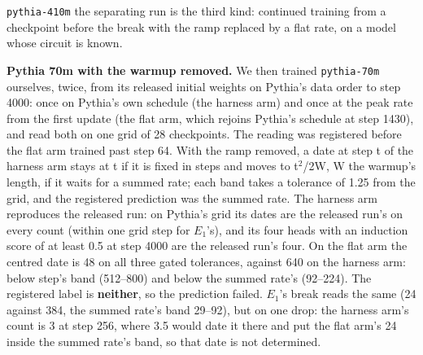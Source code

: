 \documentclass[11pt]{article}
\begin{document}
\texttt{pythia-410m} the separating run is the third kind: continued training from a checkpoint before the break with the ramp replaced by a flat rate, on a model whose circuit is known.

\textbf{Pythia 70m with the warmup removed.} We then trained \texttt{pythia-70m} ourselves, twice, from its released initial weights on Pythia's data order to step 4000: once on Pythia's own schedule (the harness arm) and once at the peak rate from the first update (the flat arm, which rejoins Pythia's schedule at step 1430), and read both on one grid of 28 checkpoints. The reading was registered before the flat arm trained past step 64. With the ramp removed, a date at step t of the harness arm stays at t if it is fixed in steps and moves to t$^{2}$/2W, W the warmup's length, if it waits for a summed rate; each band takes a tolerance of 1.25 from the grid, and the registered prediction was the summed rate. The harness arm reproduces the released run: on Pythia's grid its dates are the released run's on every count (within one grid step for $E_{1}$'s), and its four heads with an induction score of at least 0.5 at step 4000 are the released run's four. On the flat arm the centred date is 48 on all three gated tolerances, against 640 on the harness arm: below step's band (512--800) and below the summed rate's (92--224). The registered label is \textbf{neither}, so the prediction failed. $E_{1}$'s break reads the same (24 against 384, the summed rate's band 29--92), but on one drop: the harness arm's count is 3 at step 256, where 3.5 would date it there and put the flat arm's 24 inside the summed rate's band, so that date is not determined.
\end{document}
